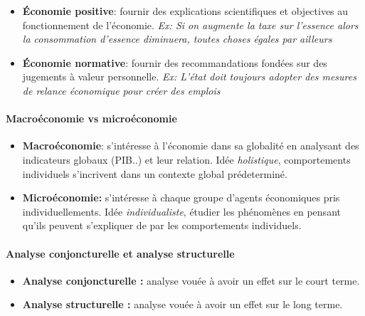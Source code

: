 \begin{itemize}[label= ]
	\item \textbf{Économie positive}: fournir des explications scientifiques et objectives au fonctionnement de l'économie. \emph{Ex: Si on augmente la taxe sur l'essence alors la consommation d'essence diminuera, toutes choses égales par ailleurs}
	\item \textbf{Économie normative}: fournir des recommandations fondées sur des jugements à valeur personnelle.
	 \emph{Ex: L'état doit toujours adopter des mesures de relance économique pour créer des emplois}
\end{itemize}

\paragraph{Macroéconomie vs microéconomie} %
\label{par:macroeconomie_vs_microeconomie}

\begin{itemize}[label= ]
	\item \textbf{Macroéconomie}: s'intéresse à l'économie dans sa globalité en analysant des indicateurs globaux (PIB..) et leur relation. Idée \emph{holistique}, comportements individuels s'incrivent dans un contexte global prédeterminé.
	\item  \textbf{Microéconomie:} s'intéresse à chaque groupe d'agents économiques pris individuellements. Idée \emph{individualiste}, étudier les phénomènes en pensant qu'ils peuvent s'expliquer de par les comportements individuels.
\end{itemize}


\paragraph{Analyse conjoncturelle et analyse structurelle} %
\label{par:analyse_conjoncturelle_et_analyse_structurelle}

\begin{itemize}[label= ]
	\item \textbf{Analyse conjoncturelle : }analyse vouée à avoir un effet sur le court terme.
	\item \textbf{Analyse structurelle :} analyse vouée à avoir un effet sur le long terme.
\end{itemize}


